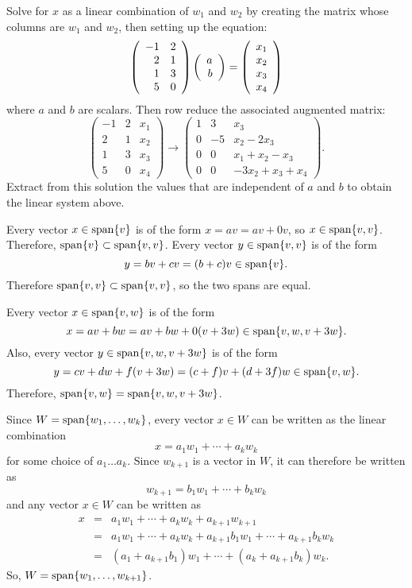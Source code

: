\documentclass{ximera}
\begin{document}
\soln Solve for $x$ as a linear combination of $w_1$ and $w_2$
by creating the matrix whose columns are $w_1$ and $w_2$,
then setting up the equation:
\[ 
\left(\begin{array}{rr} -1 & 2 \\ 2 & 1 \\ 1 & 3 \\ 5 & 0 
\end{array}\right) \left(\begin{array}{r} a \\ b\end{array}\right) = \left(\begin{array}{r} x_1 \\
x_2 \\ x_3 \\ x_4 \end{array}\right) 
\]
where $a$ and $b$ are scalars.  Then row reduce the associated
augmented matrix:
\[ 
\left(\begin{array}{rr|r} -1 & 2 & x_1 \\ 2 & 1 & x_2 \\ 1 & 3
& x_3 \\ 5 & 0 & x_4 \end{array}\right) \longrightarrow
\left(\begin{array}{rr|l} 1 & 3 & x_3 \\ 0 & -5 & x_2 - 2x_3 \\
0 & 0 & x_1 + x_2 - x_3 \\ 0 & 0 & -3x_2 + x_3 + x_4
\end{array}\right). 
\]
Extract from this solution the values that are independent of $a$
and $b$ to obtain the linear system above.


Every vector $x \in {\rm span}\{v\}$ is of the form $x = av
= av + 0v$, so $x \in {\rm span}\{v,v\}$.  Therefore, ${\rm span}\{v\}
\subset {\rm span}\{v,v\}$.  Every vector $y \in {\rm span}\{v,v\}$ is of the
form 
\[
y = bv + cv = (b + c)v \in {\rm span}\{v\}.
\]
Therefore ${\rm span}\{v,v\} \subset {\rm span}\{v,v\}$, so the two spans are equal.

 Every vector $x \in {\rm span}\{v,w\}$ is of the form 
\[
x = av + bw = av + bw + 0(v + 3w) \in {\rm span}\{v,w,v+3w\}.
\]
  Also, every vector $y \in {\rm span}\{v,w,v+3w\}$ is of the form
\[
y = cv + dw + f(v + 3w) = (c + f)v + (d + 3f)w \in {\rm span}\{v,w\}.
\]
Therefore, ${\rm span}\{v,w\} = {\rm span}\{v,w,v+3w\}$.

Since $W = {\rm span}\{w_1,\dots ,w_k\}$, every vector $x \in W$ can be
written as the linear combination
\[ x = a_1w_1 + \cdots + a_kw_k \]
for some choice of $a_1 \dots a_k$.  Since $w_{k + 1}$ is a vector in
$W$, it can therefore be written as
\[ w_{k + 1} = b_1w_1 + \cdots + b_kw_k \]
and any vector $x \in W$ can be written as
\[ \begin{array}{rcl}
x & = &
a_1w_1 + \cdots + a_kw_k + a_{k+1}w_{k+1} \\
& = & a_1w_1 + \cdots + a_kw_k + a_{k+1}b_1w_1 + \cdots + a_{k+1}b_kw_k
\\ & = & (a_1 + a_{k+1}b_1)w_1 + \cdots + (a_k + a_{k+1}b_k)w_k.
\end{array} \]
So, $W = {\rm span}\{w_1,\dots ,w_{k+1}\}$.
\end{document}
